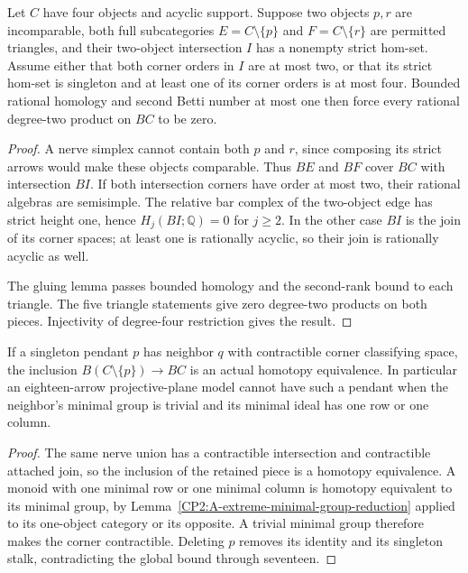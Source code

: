 \begin{theorem}
\label{CP2:A-two-permitted-triangles}
Let $C$ have four objects and acyclic support. Suppose
two objects $p,r$ are incomparable, both full subcategories
$E=C\setminus\{p\}$ and $F=C\setminus\{r\}$ are
permitted triangles, and their two-object intersection
$I$ has a nonempty strict hom-set. Assume either that
both corner orders in $I$ are at most two, or that its
strict hom-set is singleton and at least one of its
corner orders is at most four. Bounded rational homology
and second Betti number at most one then force every
rational degree-two product on $BC$ to be zero.
\end{theorem}
\begin{proof}
A nerve simplex cannot contain both $p$ and $r$, since
composing its strict arrows would make these objects
comparable. Thus $BE$ and $BF$ cover $BC$ with intersection
$BI$. If both intersection corners have order at most
two, their rational algebras are semisimple. The relative
bar complex of the two-object edge has strict height
one, hence $H_j(BI;\mathbb Q)=0$ for $j\geq2$.
In the other case $BI$ is the join of its corner spaces;
at least one is rationally acyclic, so their join is
rationally acyclic as well.

The gluing lemma passes bounded homology and the
second-rank bound to each triangle. The five triangle
statements give zero degree-two products on both pieces.
Injectivity of degree-four restriction gives the result.
\end{proof}

\begin{corollary}
\label{CP2:A-contractible-pendant-deletion}
If a singleton pendant $p$ has neighbor $q$ with contractible
corner classifying space, the inclusion
$B(C\setminus\{p\})\to BC$ is an actual homotopy equivalence.
In particular an eighteen-arrow projective-plane model
cannot have such a pendant when the neighbor's minimal
group is trivial and its minimal ideal has one row or
one column.
\end{corollary}
\begin{proof}
The same nerve union has a contractible intersection and
contractible attached join, so the inclusion of the
retained piece is a homotopy equivalence. A monoid with
one minimal row or one minimal column is homotopy
equivalent to its minimal group, by
Lemma~\ref{CP2:A-extreme-minimal-group-reduction} applied
to its one-object category or its opposite. A trivial
minimal group therefore makes the corner contractible.
Deleting $p$ removes its identity and its singleton
stalk, contradicting the global bound through seventeen.
\end{proof}
